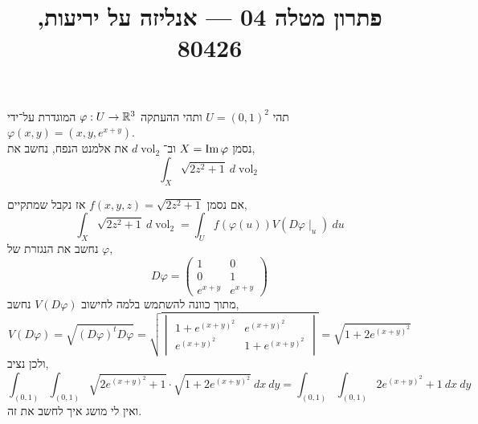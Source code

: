 
\title{פתרון מטלה 04 --- אנליזה על יריעות, 80426}

\DeclareMathOperator{\vol}{vol}


\maketitle
\maketitleprint{}

\question{}
תהי $U = {(0, 1)}^2$ ותהי ההעתקה $\varphi : U \to \mathbb{R}^3$ המוגדרת על־ידי $\varphi(x, y) = (x, y, e^{x + y})$. \\
נסמן $X = \operatorname{Im} \varphi$ וב־$d \vol_2$ את אלמנט הנפח, נחשב את,
\[
	\int_X \sqrt{2z^2 + 1}\ d\vol_2
\]
\begin{solution}
	אם נסמן $f(x, y, z) = \sqrt{2z^2 + 1}$ אז נקבל שמתקיים,
	\[
		\int_X \sqrt{2z^2 + 1}\ d\vol_2
		= \int_U f(\varphi(u)) V(D \varphi \mid_u)\ du
	\]
	נחשב את הנגזרת של $\varphi$,
	\[
		D\varphi
		= \begin{pmatrix}
			1 & 0 \\
			0 & 1 \\
			e^{x + y} & e^{x + y}
		\end{pmatrix} 
	\]
	מתוך כוונה להשתמש בלמה לחישוב $V(D \varphi)$ נחשב,
	\[
		V(D\varphi)
		= \sqrt{{(D\varphi)}^t D \varphi}
		= \sqrt{\begin{vmatrix}
				1 + e^{{(x + y)}^2} & e^{{(x + y)}^2} \\
				e^{{(x + y)}^2} & 1 + e^{{(x + y)}^2}
		\end{vmatrix}}
		= \sqrt{1 + 2e^{{(x + y)}^2}}
	\]
	ולכן נציב,
	\[
		\int_{(0, 1)} \int_{(0, 1)} \sqrt{2 e^{{(x + y)}^2} + 1} \cdot \sqrt{1 + 2 e^{{(x + y)}^2}}\ dx\ dy
		= \int_{(0, 1)} \int_{(0, 1)} 2 e^{{(x + y)}^2} + 1\ dx\ dy
	\]
	ואין לי מושג איך לחשב את זה.
\end{solution}

